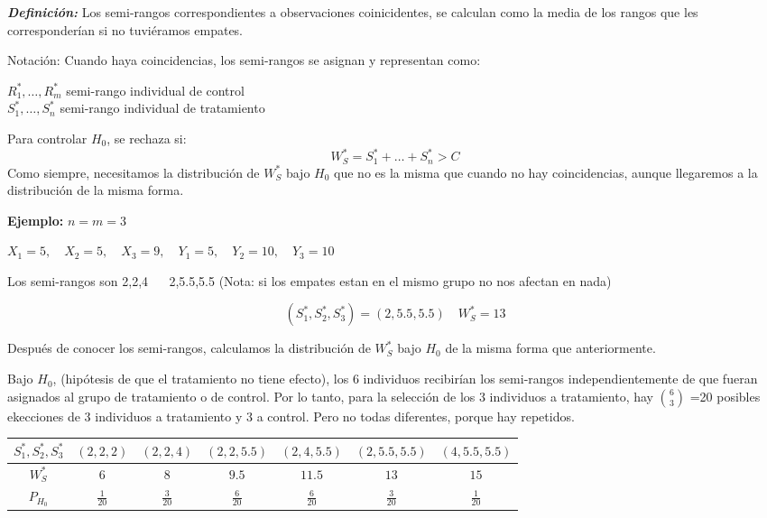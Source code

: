 \textbf{\textit{Definición: }}Los semi-rangos correspondientes a observaciones coinicidentes, se calculan como la media de los rangos que les corresponderían si no tuviéramos empates.

Notación:
Cuando haya coincidencias, los semi-rangos se asignan y representan como:
\begin{center}
$R_1^*,\dots,R_m^*$ semi-rango individual de control \\
$S_1^*,\dots,S_n^*$ semi-rango individual de tratamiento
\end{center}

Para controlar $H_0$, se rechaza si:
\[
    W_S^*=S_1^*+\dots+S_n^*>C
\]
Como siempre, necesitamos la distribución de $W_S^*$ bajo $H_0$ que no es la misma que cuando no hay coincidencias, aunque llegaremos a la distribución de la misma forma.

\textbf{Ejemplo:}
$n=m=3$

\(
X_1=5, \quad X_2=5, \quad X_3=9, \quad Y_1=5,\quad Y_2=10,\quad Y_3=10
\)

Los semi-rangos son 2,2,4 $\quad$ 2,5.5,5.5
(Nota: si los empates estan en el mismo grupo no nos afectan en nada)

\[
(S_1^*,S_2^*,S_3^*)=(2,5.5,5.5) \quad W_S^*=13
\]

Después de conocer los semi-rangos, calculamos la distribución de $W_S^*$ bajo $H_0$ de la misma forma que anteriormente.

Bajo $H_0$, (hipótesis de que el tratamiento no tiene efecto), los 6 individuos recibirían los semi-rangos independientemente de que fueran asignados al grupo de tratamiento o de control. Por lo tanto, para la selección de los 3 individuos a tratamiento, hay $\binom{6}{3}$
=20 posibles ekecciones de 3 individuos a tratamiento y 3 a control. Pero no todas diferentes, porque hay repetidos.

\begin{table}[h!]
    \centering
    \begin{tabular}{c|c|c|c|c|c|c}
    $S_1^*,S_2^*,S_3^*$ & $(2,2,2)$ & $(2,2,4)$ & $(2,2,5.5)$ & $(2,4,5.5)$ & $(2,5.5,5.5)$ & $(4,5.5,5.5)$ \\ \hline
    $W_S^*$             & $6$       & $8$       & $9.5$       & $11.5$      & $13$          & $15$          \\ \hline
    $P_{H_0}$           & $\frac{1}{20}$ & $\frac{3}{20}$ & $\frac{6}{20}$ & $\frac{6}{20}$ & $\frac{3}{20}$ & $\frac{1}{20}$
    \end{tabular}
\end{table}

